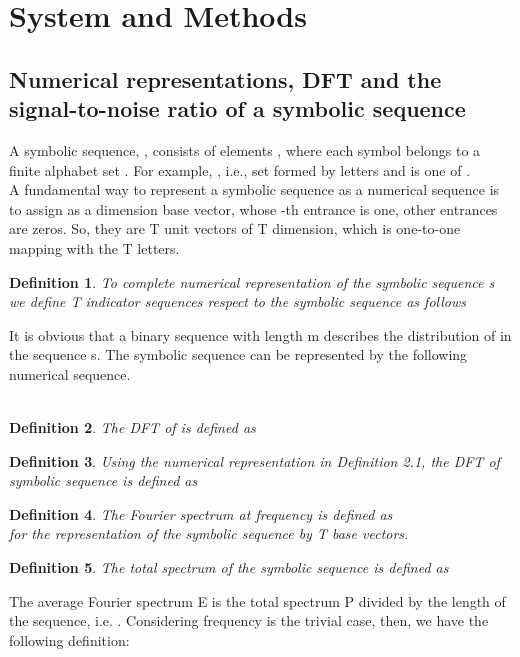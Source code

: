\documentclass[preprint,authoryear,12pt]{elsarticle}
\newtheorem{definition}{Definition}[section]\newtheorem{theory}{Theory}
\begin{document}
\section{System and Methods}
\subsection{Numerical representations, DFT and the signal-to-noise ratio of a symbolic sequence }
A symbolic sequence, , consists of elements , where each symbol  belongs to a finite alphabet set .  For example, , i.e., set   formed by   letters  and  is one of .\\
A fundamental way to represent a symbolic sequence as a numerical sequence is to assign  as a dimension   base vector,  whose -th entrance is one, other entrances are zeros. So, they are T unit vectors of T dimension, which is one-to-one mapping with the T letters. \\
\begin{definition}
 To complete numerical representation of the symbolic sequence s we define T indicator sequences respect to the symbolic sequence  as follows\\
 
\end{definition}

It is obvious that a binary sequence   with length m describes the distribution of   in the sequence s. The symbolic sequence can be represented by the following numerical sequence.\\

\\
\begin{definition}
 The DFT of     is defined as \\

\end{definition}
\begin{definition}
Using the numerical representation in Definition 2.1, the DFT of symbolic sequence  is defined as\\

\end{definition}
\begin{definition}
The Fourier spectrum at frequency  is defined as\\

for the representation of the symbolic sequence by T base vectors.
\end{definition}
\begin{definition}
The total spectrum of the symbolic sequence is defined as\\

\end{definition}
The average Fourier spectrum E  is the total spectrum P divided by the length of the sequence, i.e. . Considering frequency  is the trivial case, then, we have the following definition:\\
\end{document}
